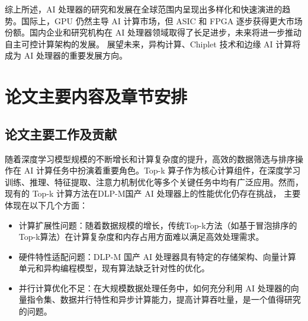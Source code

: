 综上所述，AI 处理器的研究和发展在全球范围内呈现出多样化和快速演进的趋势。国际上，GPU 仍然主导 AI 计算市场，但 ASIC 
和 FPGA 逐步获得更大市场份额。国内企业和研究机构在 AI 处理器领域取得了长足进步，未来将进一步推动自主可控计算架构的发展。
展望未来，异构计算、Chiplet 技术和边缘 AI 计算将成为 AI 处理器的重要发展方向。



\section{论文主要内容及章节安排}





\subsection{论文主要工作及贡献}
随着深度学习模型规模的不断增长和计算复杂度的提升，高效的数据筛选与排序操作在 AI 计算任务中扮演着重要角色。Top-k 算子作为核心计算组件，在深度学习训练、推理、特征提取、注意力机制优化等多个关键任务中均有广泛应用。然而，现有的 Top-k 计算方法在DLP-M国产 AI 处理器上的性能优化仍存在挑战，
主要体现在以下几个方面：

\begin{itemize}
    \item 计算扩展性问题：随着数据规模的增长，传统Top-k方法（如基于冒泡排序的Top-k算法）在计算复杂度和内存占用方面难以满足高效处理需求。
    \item 硬件特性适配问题：DLP-M 国产 AI 处理器具有特定的存储架构、向量计算单元和异构编程模型，现有算法缺乏针对性的优化。
    \item 并行计算优化不足：在大规模数据处理任务中，如何充分利用 AI 处理器的向量指令集、数据并行特性和异步计算能力，提高计算吞吐量，是一个值得研究的问题。
\end{itemize}


